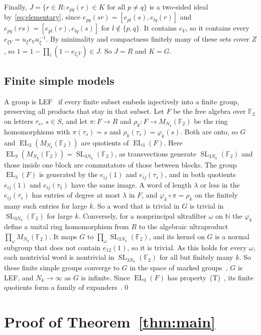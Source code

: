 \documentclass[11pt]{amsart}
\newcommand{\F}{\mathbb F}
\newcommand{\EL}{\operatorname{EL}}
\newcommand{\SL}{\operatorname{SL}}
\begin{document}
Finally, $J=\{r\in R:e_{pq}(r)\in K\text{ for all }p\ne q\}$ is a
two-sided ideal by~\eqref{eq:elementary}, since
$e_{pq}(sr)=[e_{pl}(s),e_{lq}(r)]$ and $e_{pq}(rs)=[e_{pl}(r),e_{lq}(s)]$
for $l\notin\{p,q\}$. It contains $e_V$, so it contains every
$e_{\xi V}=u_\xi e_Vu_\xi^{-1}$. By minimality and compactness finitely many
of these sets cover $Z$, so $1=1-\prod_i(1-e_{\xi_iV})\in J$. So $J=R$ and
$K=G$.

\subsection*{Finite simple models}
A group is LEF~\cite{VershikGordon} if every finite subset embeds
injectively into a finite group, preserving all products that stay in
that subset. Let $F$ be the free algebra over $\F_2$ on letters $\tau_s$,
$s\in S$, and let $\pi\colon F\to R$ and $\rho_k\colon F\to M_{N_k}(\F_2)$
be the ring homomorphisms with $\pi(\tau_s)=s$ and
$\rho_k(\tau_s)=\varphi_k(s)$. Both are onto, so $G$ and
$\EL_3(M_{N_k}(\F_2))$ are quotients of $\EL_3(F)$. Here
$\EL_3(M_{N_k}(\F_2))=\SL_{3N_k}(\F_2)$, as transvections generate
$\SL_{3N_k}(\F_2)$ and those inside one block are commutators of those
between blocks. The group $\EL_3(F)$ is generated by the $e_{ij}(1)$ and
$e_{ij}(\tau_s)$, and in both quotients $e_{ij}(1)$ and $e_{ij}(\tau_1)$
have the same image. A word of length $\lambda$ or less in
the $e_{ij}(\tau_s)$ has entries of degree at most $\lambda$ in $F$, and $\varphi_k\circ\pi=\rho_k$ on the finitely many such entries for
large $k$. So a word that is trivial in $G$ is trivial in
$\SL_{3N_k}(\F_2)$ for large $k$. Conversely, for a nonprincipal
ultrafilter $\omega$ on $\mathbb N$ the $\varphi_k$ define a unital ring
homomorphism from $R$ to the algebraic ultraproduct
$\prod_\omega M_{N_k}(\F_2)$. It maps $G$ to $\prod_\omega\SL_{3N_k}(\F_2)$,
and its kernel on $G$ is a normal subgroup that does not contain
$e_{12}(1)$, so it is trivial. As this holds for every $\omega$, each
nontrivial word is nontrivial in $\SL_{3N_k}(\F_2)$ for all but finitely
many $k$. So these finite simple groups converge to $G$ in the space of
marked groups~\cite{Grigorchuk,Champetier}, $G$ is LEF, and
$N_k\to\infty$ as $G$ is infinite. Since $\EL_3(F)$ has property~\textup{(T)}~\cite[Theorem~1.1]{EJZ},
its finite quotients form a family of expanders~\cite{Margulis,Kassabov}.\qed

\section{Proof of Theorem~\ref{thm:main}}\label{sec:main}
\end{document}
